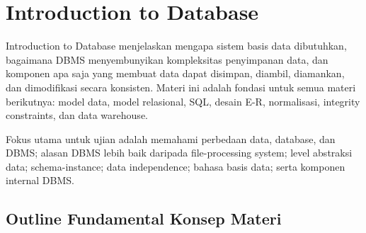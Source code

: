 \section{Introduction to Database}

Introduction to Database menjelaskan mengapa sistem basis data dibutuhkan, bagaimana DBMS menyembunyikan kompleksitas penyimpanan data, dan komponen apa saja yang membuat data dapat disimpan, diambil, diamankan, dan dimodifikasi secara konsisten. Materi ini adalah fondasi untuk semua materi berikutnya: model data, model relasional, SQL, desain E-R, normalisasi, integrity constraints, dan data warehouse.

Fokus utama untuk ujian adalah memahami perbedaan data, database, dan DBMS; alasan DBMS lebih baik daripada file-processing system; level abstraksi data; schema-instance; data independence; bahasa basis data; serta komponen internal DBMS.

\subsection{Outline Fundamental Konsep Materi}

